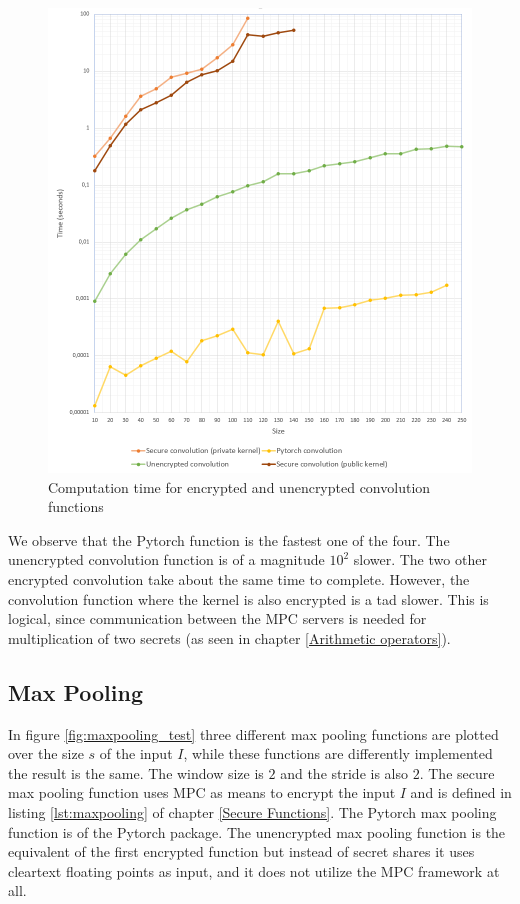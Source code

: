 \begin{figure}[H]
  \includegraphics[scale=0.6]{fig/convolution_test.png}
  \centering
  \caption{Computation time for encrypted and unencrypted convolution functions}
  \label{fig:convolution_test}
\end{figure}

We observe that the Pytorch function is the fastest one of the four. The unencrypted convolution function is of a magnitude $10^2$ slower. The two other encrypted convolution take about the same time to complete. However, the convolution function where the kernel is also encrypted is a tad slower. This is logical, since communication between the MPC servers is needed for multiplication of two secrets (as seen in chapter \ref{Arithmetic operators}).

\subsection{Max Pooling}
In figure \ref{fig:maxpooling_test} three different max pooling functions are plotted over the size $s$ of the input $I$, while these functions are differently implemented the result is the same. The window size is $2$ and the stride is also $2$. The secure max pooling function uses MPC as means to encrypt the input $I$ and is defined in listing \ref{lst:maxpooling} of chapter \ref{Secure Functions}. The Pytorch max pooling function is  of the Pytorch package. The unencrypted max pooling function is the equivalent of the first encrypted function but instead of secret shares it uses cleartext floating points as input, and it does not utilize the MPC framework at all.

